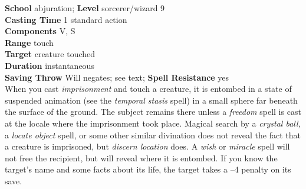 \textbf{School} abjuration; \textbf{Level} sorcerer/wizard 9\\
\textbf{Casting Time} 1 standard action\\
\textbf{Components} V, S\\
\textbf{Range} touch\\
\textbf{Target} creature touched\\
\textbf{Duration} instantaneous\\
\textbf{Saving Throw }Will negates; see text; \textbf{Spell Resistance} yes\\
When you cast \textit{imprisonment }and touch a creature, it is entombed in a state of suspended animation (see the \textit{temporal stasis }spell) in a small sphere far beneath the surface of the ground. The subject remains there unless a \textit{freedom }spell is cast at the locale where the imprisonment took place. Magical search by a \textit{crystal ball, }a \textit{locate object }spell, or some other similar divination does not reveal the fact that a creature is imprisoned, but \textit{discern location }does. A \textit{wish }or \textit{miracle }spell will not free the recipient, but will reveal where it is entombed. If you know the target's name and some facts about its life, the target takes a –4 penalty on its save.\\
